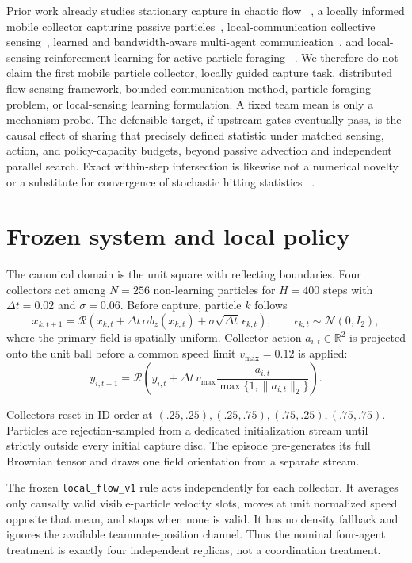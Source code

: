 \documentclass{article}
\begin{document}
Prior work already studies stationary capture in chaotic flow
~\cite{wang2021stationary}, a locally informed mobile collector capturing
passive particles~\cite{wang2025collector}, local-communication collective
sensing~\cite{hornischer2019cimax}, learned and bandwidth-aware multi-agent
communication~\cite{foerster2016dial,wang2020imac}, and local-sensing
reinforcement learning for active-particle foraging
~\cite{loeffler2023foraging}. We therefore do not claim the first mobile
particle collector, locally guided capture task, distributed flow-sensing
framework, bounded communication method, particle-foraging problem, or
local-sensing learning formulation. A fixed team mean is only a mechanism
probe. The defensible target, if upstream gates eventually pass, is the causal
effect of sharing that precisely defined statistic under matched sensing,
action, and policy-capacity budgets, beyond passive advection and independent
parallel search. Exact within-step intersection is likewise not a numerical
novelty or a substitute for convergence of stochastic hitting statistics
~\cite{gobet2000,giles2008}.

\section{Frozen system and local policy}

The canonical domain is the unit square with reflecting boundaries. Four
collectors act among \(N=256\) non-learning particles for \(H=400\) steps with
\(\Delta t=0.02\) and \(\sigma=0.06\). Before capture, particle \(k\) follows
\[
 x_{k,t+1}=\mathcal R\!\left(x_{k,t}+\Delta t\,\alpha b_z(x_{k,t})
 +\sigma\sqrt{\Delta t}\,\epsilon_{k,t}\right),
 \qquad \epsilon_{k,t}\sim\mathcal N(0,I_2),
\]
where the primary field is spatially uniform. Collector action
\(a_{i,t}\in\mathbb R^2\) is projected onto the unit ball before a common speed
limit \(v_{\max}=0.12\) is applied:
\[
 y_{i,t+1}=\mathcal R\!\left(y_{i,t}+\Delta t\,v_{\max}
 \frac{a_{i,t}}{\max\{1,\lVert a_{i,t}\rVert_2\}}\right).
\]

Collectors reset in ID order at
\((.25,.25),(.25,.75),(.75,.25),(.75,.75)\). Particles are rejection-sampled
from a dedicated initialization stream until strictly outside every initial
capture disc. The episode pre-generates its full Brownian tensor and draws one
field orientation from a separate stream.

The frozen \texttt{local\_flow\_v1} rule acts independently for each collector.
It averages only causally valid visible-particle velocity slots, moves at unit
normalized speed opposite that mean, and stops when none is valid. It has no
density fallback and ignores the available teammate-position channel. Thus the
nominal four-agent treatment is exactly four independent replicas, not a
coordination treatment.
\end{document}
